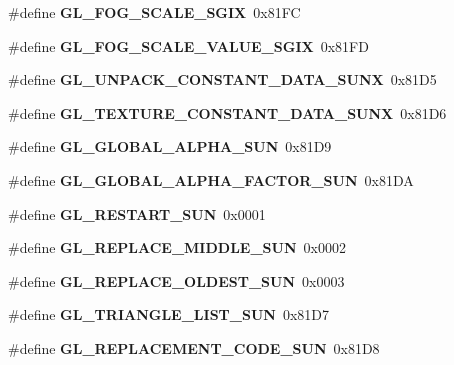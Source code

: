 \begin{DoxyCompactItemize}
\item 
\#define {\bfseries G\+L\+\_\+\+F\+O\+G\+\_\+\+S\+C\+A\+L\+E\+\_\+\+S\+G\+I\+X}~0x81\+F\+C\label{_s_d_l__opengl_8h_a8da36320d0603687fefd8e00f7c318fb}

\item 
\#define {\bfseries G\+L\+\_\+\+F\+O\+G\+\_\+\+S\+C\+A\+L\+E\+\_\+\+V\+A\+L\+U\+E\+\_\+\+S\+G\+I\+X}~0x81\+F\+D\label{_s_d_l__opengl_8h_acbd15d49d0d118877cebf5411f3f244a}

\item 
\#define {\bfseries G\+L\+\_\+\+U\+N\+P\+A\+C\+K\+\_\+\+C\+O\+N\+S\+T\+A\+N\+T\+\_\+\+D\+A\+T\+A\+\_\+\+S\+U\+N\+X}~0x81\+D5\label{_s_d_l__opengl_8h_a09401c55355a5d415dd2940ecd413987}

\item 
\#define {\bfseries G\+L\+\_\+\+T\+E\+X\+T\+U\+R\+E\+\_\+\+C\+O\+N\+S\+T\+A\+N\+T\+\_\+\+D\+A\+T\+A\+\_\+\+S\+U\+N\+X}~0x81\+D6\label{_s_d_l__opengl_8h_a80f3779b5c63acd7ea8da46f95d31c58}

\item 
\#define {\bfseries G\+L\+\_\+\+G\+L\+O\+B\+A\+L\+\_\+\+A\+L\+P\+H\+A\+\_\+\+S\+U\+N}~0x81\+D9\label{_s_d_l__opengl_8h_a0056039b84c248f8a4db45d7e57cf5f4}

\item 
\#define {\bfseries G\+L\+\_\+\+G\+L\+O\+B\+A\+L\+\_\+\+A\+L\+P\+H\+A\+\_\+\+F\+A\+C\+T\+O\+R\+\_\+\+S\+U\+N}~0x81\+D\+A\label{_s_d_l__opengl_8h_a5b5c02b7caafd4b8633cb351165c025b}

\item 
\#define {\bfseries G\+L\+\_\+\+R\+E\+S\+T\+A\+R\+T\+\_\+\+S\+U\+N}~0x0001\label{_s_d_l__opengl_8h_af03f23b8693cc5138590fb5d2d471c61}

\item 
\#define {\bfseries G\+L\+\_\+\+R\+E\+P\+L\+A\+C\+E\+\_\+\+M\+I\+D\+D\+L\+E\+\_\+\+S\+U\+N}~0x0002\label{_s_d_l__opengl_8h_ae4a36d932b98b9baad12699fde6fc5bc}

\item 
\#define {\bfseries G\+L\+\_\+\+R\+E\+P\+L\+A\+C\+E\+\_\+\+O\+L\+D\+E\+S\+T\+\_\+\+S\+U\+N}~0x0003\label{_s_d_l__opengl_8h_a2e714c5c9a9c2402d673ff1920b64303}

\item 
\#define {\bfseries G\+L\+\_\+\+T\+R\+I\+A\+N\+G\+L\+E\+\_\+\+L\+I\+S\+T\+\_\+\+S\+U\+N}~0x81\+D7\label{_s_d_l__opengl_8h_a9c5f6331384a5b3d1e00d9ffa7bc7541}

\item 
\#define {\bfseries G\+L\+\_\+\+R\+E\+P\+L\+A\+C\+E\+M\+E\+N\+T\+\_\+\+C\+O\+D\+E\+\_\+\+S\+U\+N}~0x81\+D8\label{_s_d_l__opengl_8h_ad08ecd4da67bec8849db86f5ed523742}


\end{DoxyCompactItemize}
